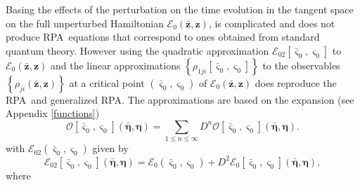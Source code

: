 \documentclass[aps,preprint]{revtex4}%
\begin{document}
Basing the effects of the perturbation on the time evolution in the tangent
space on the full unperturbed Hamiltonian $\mathcal{E}_{0}\left(
\mathbf{\bar{z}},\mathbf{z}\right)  $, is complicated and does not produce
RPA\ equations that correspond to ones obtained from standard quantum theory.
However using the quadratic approximation $\mathcal{E}_{02}\left[
\mathbf{\bar{\varsigma}}_{0},\mathbf{\varsigma}_{0}\right]  $ to
$\mathcal{E}_{0}\left(  \mathbf{\bar{z}},\mathbf{z}\right)  $ and the linear
approximations $\left\{  \rho_{1ji}\left[  \mathbf{\bar{\varsigma}}%
_{0},\mathbf{\varsigma}_{0}\right]  \right\}  $ to the observables $\left\{
\rho_{ji}\left(  \mathbf{\bar{z}},\mathbf{z}\right)  \right\}  $ at a critical
point $\left(  \mathbf{\bar{\varsigma}}_{0},\mathbf{\varsigma}_{0}\right)  $
of $\mathcal{E}_{0}\left(  \mathbf{\bar{z}},\mathbf{z}\right)  $ does
reproduce the RPA\ and generalized RPA. The approximations are based on the
expansion (see Appendix \ref{functions})%
\begin{equation}
\mathcal{O}\left[  \mathbf{\bar{\varsigma}}_{0},\mathbf{\varsigma}_{0}\right]
\left(  \mathbf{\bar{\eta},\eta}\right)  =\sum_{1\leq n\leq\infty}%
D^{n}\mathcal{O}\left[  \mathbf{\bar{\varsigma}}_{0},\mathbf{\varsigma}%
_{0}\right]  \left(  \mathbf{\bar{\eta},\eta}\right)  .
\end{equation}
with $\mathcal{E}_{02}\left(  \mathbf{\bar{\varsigma}}_{0},\mathbf{\varsigma
}_{0}\right)  $ given by
\begin{equation}
\mathcal{E}_{02}\left[  \mathbf{\bar{\varsigma}}_{0},\mathbf{\varsigma}%
_{0}\right]  \left(  \mathbf{\bar{\eta},\eta}\right)  =\mathcal{E}_{0}\left(
\mathbf{\bar{\varsigma}}_{0},\mathbf{\varsigma}_{0}\right)  +D^{2}%
\mathcal{E}_{0}\left[  \mathbf{\bar{\varsigma}}_{0},\mathbf{\varsigma}%
_{0}\right]  \left(  \mathbf{\bar{\eta},\eta}\right)  ,
\end{equation}
where
\end{document}
